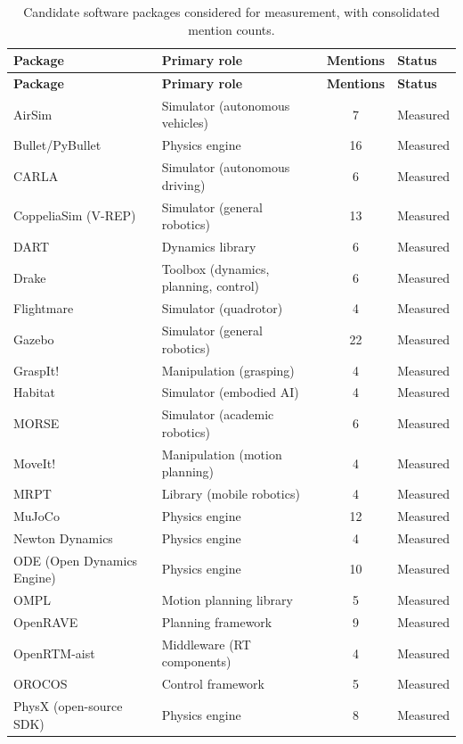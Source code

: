 \begin{singlespace}
\begin{longtable}{@{}p{3.7cm}p{4.6cm}cp{2.9cm}@{}}
\caption{Candidate software packages considered for measurement, with consolidated mention counts.}
\label{tab:full-candidate-list}\\
\toprule
\textbf{Package} & \textbf{Primary role} & \textbf{Mentions} & \textbf{Status} \\
\midrule
\endfirsthead
\toprule
\textbf{Package} & \textbf{Primary role} & \textbf{Mentions} & \textbf{Status} \\
\midrule
\endhead
AirSim & Simulator (autonomous vehicles) & 7 & Measured \\
Bullet/PyBullet & Physics engine & 16 & Measured \\
CARLA & Simulator (autonomous driving) & 6 & Measured \\
CoppeliaSim (V-REP) & Simulator (general robotics) & 13 & Measured \\
DART & Dynamics library & 6 & Measured \\
Drake & Toolbox (dynamics, planning, control) & 6 & Measured \\
Flightmare & Simulator (quadrotor) & 4 & Measured \\
Gazebo & Simulator (general robotics) & 22 & Measured \\
GraspIt! & Manipulation (grasping) & 4 & Measured \\
Habitat & Simulator (embodied AI) & 4 & Measured \\
MORSE & Simulator (academic robotics) & 6 & Measured \\
MoveIt! & Manipulation (motion planning) & 4 & Measured \\
MRPT & Library (mobile robotics) & 4 & Measured \\
MuJoCo & Physics engine & 12 & Measured \\
Newton Dynamics & Physics engine & 4 & Measured \\
ODE (Open Dynamics Engine) & Physics engine & 10 & Measured \\
OMPL & Motion planning library & 5 & Measured \\
OpenRAVE & Planning framework & 9 & Measured \\
OpenRTM-aist & Middleware (RT components) & 4 & Measured \\
OROCOS & Control framework & 5 & Measured \\
PhysX (open-source SDK) & Physics engine & 8 & Measured \\

\end{longtable}
\end{singlespace}
